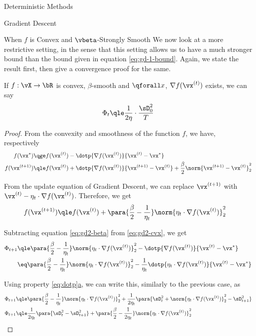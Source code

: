 \documentclass{article}
\newcommand{\f}[1]{f(\vx^{(#1)})}
\newcommand{\fs}{f(\vx^\ast)}
\newcommand{\gf}[1]{\nabla f(\vx^{(#1)})}
\newcommand{\x}[1]{\vx^{(#1)}}
\newcommand{\xs}{\vx^{\ast}}
\begin{document}
\begin{psection}{Deterministic Methods}
\begin{psubsection}{Gradient Descent}
\begin{pssubsection}{When $f$ is Convex and $\vbeta$-Strongly Smooth}
			We now look at a more restrictive setting, in the sense that this setting allows us to have a much stronger bound than the bound given in equation \ref{eq:gd-1-bound}. Again, we state the result first, then give a convergence proof for the same. \sbr

			\begin{theorem}
				If $f : \vX \to \bR$ is convex, $\beta$-smooth and $\qforall x$, $\gf{t}$ exists, we can say
				\begin{align}
					\Phi_t	\qle	\frac{1}{2 \eta} \cdot \frac{\sD_0^2}{T}
					\label{eq:gd-cvx-bddg}
				\end{align}
				\label{th:gd-cvx-bddg}

				\begin{proof}
					From the convexity and smoothness of the function $f$, we have, respectively
					\begin{align}
						\fs			&\qge	\f{t} - \dotp{\gf{t}}{\x{t} - \xs} \label{eq:gd2-beta} \\
						\f{t + 1}	&\qle	\f{t} + \dotp{\gf{t}}{\x{t + 1} - \x{t}} + \frac{\beta}{2} \norm{\x{t + 1} - \x{t}}_2^2 \nonumber
					\end{align}

					From the update equation of Gradient Descent, we can replace $\x{t + 1}$ with $\x{t} - \eta_t \cdot \gf{t}$. Therefore, we get
					\begin{align}
						\f{t + 1}	&\qle	\f{t} + \para{\frac{\beta}{2} - \frac{1}{\eta_t}} \norm{\eta_t \cdot \gf{t}}_2^2 \label{eq:gd2-cvx}
					\end{align}

					Subtracting equation \ref{eq:gd2-beta} from \ref{eq:gd2-cvx}, we get
					\begin{align*}
						\Phi_{t + 1}	&\qle	\para{\frac{\beta}{2} - \frac{1}{\eta_t}} \norm{\eta_t \cdot \gf{t}}_2^2 - \dotp{\gf{t}}{\x{t} - \xs} \\
						&\eq	\para{\frac{\beta}{2} - \frac{1}{\eta_t}} \norm{\eta_t \cdot \gf{t}}_2^2 - \frac{1}{\eta_t} \dotp{\eta_t \cdot \gf{t}}{\x{t} - \xs}
					\end{align*}

					Using property \hyperref[eq:dotp]{\ref*{eq:dotp}a}, we can write this, similarly to the previous case, as
					\begin{align*}
						\Phi_{t + 1}	&\qle	\para{\frac{\beta}{2} - \frac{1}{\eta_t}} \norm{\eta_t \cdot \gf{t}}_2^2 + \frac{1}{2 \eta_t} \para{\sD_t^2 + \norm{\eta_t \cdot \gf{t}}_2^2 - \sD_{t + 1}^2} \\
						\Phi_{t + 1}	&\qle	\frac{1}{2 \eta_t} \para{\sD_t^2 - \sD_{t + 1}^2} + \para{\frac{\beta}{2} - \frac{1}{2 \eta_t}} \norm{\eta_t \cdot \gf{t}}_2^2
					\end{align*}


\end{proof}
\end{theorem}
\end{pssubsection}
\end{psubsection}
\end{psection}
\end{document}
